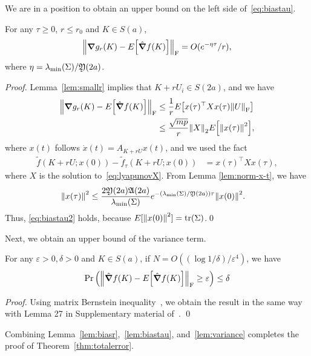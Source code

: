 We are in a position to obtain an upper bound on the left side of~\eqref{eq:biastau}.
\begin{lemma}
  \label{lem:biastau}
  For any $\tau \geq 0$, $r \leq r_0$ and $K\in S(a)$,
  \begin{align}
    \norm{\grad g_r(K)-E\qty[\hat\grad f(K)]}_\mathrm{F} =
    O(e^{-\eta \tau}/r),\label{eq:biastau2}
  \end{align}
  where $\eta = \lambda_{\min}(\Sigma)/\mathfrak{Y}(2a)$.
\end{lemma}
\begin{proof}
  Lemma~\ref{lem:smallr} implies that $K+rU_i \in S(2a)$, and we have
  \begin{align}
    \norm{\grad g_r(K)-E\qty[\hat\grad f(K)]}_\mathrm{F}  &\leq  \frac{1}{r} E\qty[x(\tau)^\top Xx(\tau)\norm{U}_\mathrm{F}]   \\
    &\leq \frac{\sqrt{mp}}{r} \norm{X}_2E\qty[\norm{x(\tau)}^2],
  \end{align}
  where
  $x(t)$ follows
    $\dot x(t)  = A_{K+rU} x(t)$, and
  we used the fact
  \begin{align}
    \tilde f(K+rU;x(0))-\tilde f_\tau(K+rU;x(0)) & = x(\tau)^\top Xx(\tau),
  \end{align}
  where $X$ is the solution to~\eqref{eq:lyapunovX}.
  From Lemma \ref{lem:norm-x-t}, we have
  \begin{align}
    \norm{x(\tau)}^2 & \leq \frac{2\mathfrak{Y}(2a)\mathfrak{A}(2a)}{\lambda_{\min}(\Sigma)}e^{-(\lambda_{\min}(\Sigma)/\mathfrak{Y}(2a))\tau}\norm{x(0)}^2.
  \end{align}
  Thus, \eqref{eq:biastau2} holds,
  because $E[\norm{x(0)}^2]=\tr(\Sigma)$.\qed
\end{proof}

Next, we obtain an upper bound of the variance term.
\begin{lemma}
  \label{lem:variance}
  For any $\varepsilon > 0, \delta > 0$ and $K\in S(a)$, if $N = O((\log 1/\delta)/\varepsilon^4)$, we have
  \begin{align}
    \Probability\qty(\normF{\hat \grad f(K)-E\qty[\hat \grad f(K)]}\geq \varepsilon)\leq \delta
  \end{align}
\end{lemma}
\begin{proof}
    Using matrix Bernstein inequality~\cite{tropp2012user}, we obtain the result in the same way with Lemma 27 in Supplementary material of~\cite{fazel2018global}. \qed
\end{proof}

Combining Lemma~\ref{lem:biasr},~\ref{lem:biastau}, and~\ref{lem:variance} completes the proof of Theorem~\ref{thm:totalerror}.

